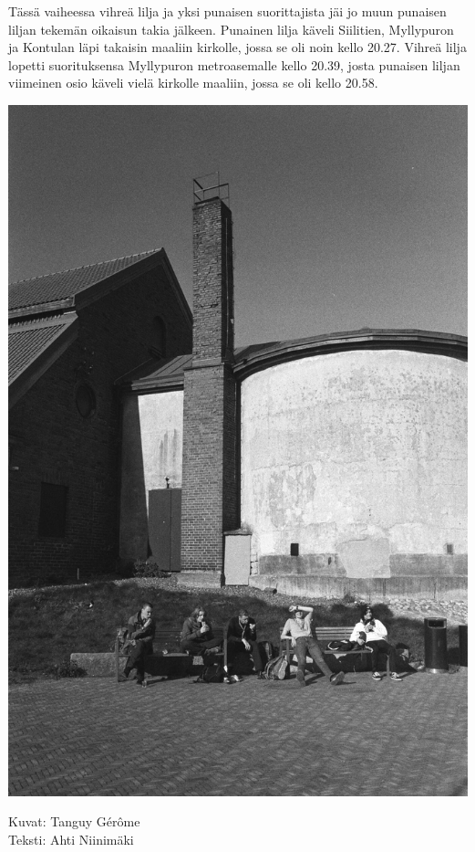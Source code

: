 \begin{multicols}{2}
Tässä vaiheessa vihreä lilja ja yksi punaisen suorittajista jäi jo muun 
punaisen liljan tekemän oikaisun takia jälkeen. Punainen lilja käveli 
Siilitien, Myllypuron ja Kontulan läpi takaisin maaliin kirkolle, jossa se oli 
noin kello 20.27. Vihreä lilja lopetti suorituksensa Myllypuron metroasemalle 
kello 20.39, josta punaisen liljan viimeinen osio käveli vielä kirkolle 
maaliin, jossa se oli kello 20.58.

\vspace*{.25cm}

\noindent\includegraphics[width=\linewidth]{assets/nahkaliljapunainen3.jpg}

\vspace*{.25cm}

{\raggedleft Kuvat: Tanguy Gérôme\\Teksti: Ahti Niinimäki\par}
\end{multicols}
